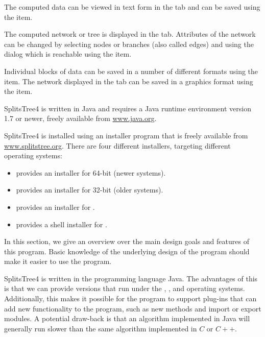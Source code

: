 \documentclass[11pt]{article}
\def\SplitsTree{{\sf SplitsTree4 }}
\begin{document}
The computed data can be viewed in text form in the 
tab and can be saved using the  item.

The computed network or tree is displayed in the 
tab. Attributes of the network can be changed by selecting nodes or branches
(also called edges)
and using the  dialog which is reachable using
the  item.

Individual blocks of data can be saved in a number of different
formats using the  item.
The network displayed in the  tab can
be saved in a graphics format using the 
item.


\SplitsTree is written in Java and requires a Java runtime environment
version 1.7 or newer, freely available from \href{http://www.java.org}{www.java.org}.

\SplitsTree is installed using an installer program that is freely available
from \href{http://www.splitstree.org}{www.splitstree.org}.
There are four different installers, targeting different operating systems:
\begin{itemize}
\item {} provides an installer for  64-bit (newer systems).
\item {} provides an installer for  32-bit (older systems).
\item {} provides an installer for .
\item {} provides a shell installer for .
\end{itemize}


In this section, we give an overview over the main design goals
and features of this program. Basic knowledge of the underlying design of
the program should make it easier to use the program.

\SplitsTree is written in the programming language Java.
The advantages of this is that we can provide versions that run under the
, ,  and  operating systems.
Additionally, this makes it possible for the program to support plug-ins
that can add new functionality to the program, such as new methods
and import or export modules.
A potential draw-back is that an algorithm implemented in Java will generally
run slower than the same algorithm implemented in $C$ or $C{+}{+}$.
\end{document}
